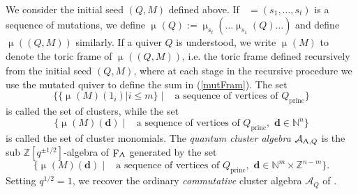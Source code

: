 \documentclass[a4paper,10pt]{amsart}
\newcommand{\dd}{\mathbf{d}}
\renewcommand{\Lambda}{\Uplambda}
\renewcommand{\mu}{\upmu}
\DeclareMathOperator{\For}{F}
\DeclareMathOperator{\princ}{princ}
\DeclareMathOperator{\Ss}{\overline{s}}
\begin{document}
We consider the initial seed $(Q,M)$ defined above.  If $\Ss=(s_1,\ldots,s_t)$ is a sequence of mutations, we define $\mu_{\Ss}(Q):=\mu_{s_t}(\ldots\mu_{s_1}(Q)\ldots )$ and define $\mu_{\Ss}((Q,M))$ similarly.  If a quiver $Q$ is understood, we write $\mu_{\Ss}(M)$ to denote the toric frame of $\mu_{\Ss}((Q,M))$, i.e. the toric frame defined recursively from the initial seed $(Q,M)$, where at each stage in the recursive procedure we use the mutated quiver to define the sum in (\ref{mutFram}).  The set 
\[
\big\{\{\mu_{\Ss}(M)(1_i)|i\leq m\}\;|\;\Ss\textrm{ a sequence of vertices of }Q_{\princ}\big\}
\]
is called the set of clusters, while the set 
\[
\{\mu_{\Ss}(M)(\dd)\;|\;\Ss\textrm{ a sequence of vertices of }Q_{\princ},\,\,\dd\in \mathbb{N}^{n}\}
\]
is called the set of cluster monomials.  The \textit{quantum cluster algebra} $\mathcal{A}_{\Lambda,Q}$ is the sub $\mathbb{Z}[q^{\pm 1/2}]$-algebra of $\For_{\Lambda}$ generated by the set
\[
\{\mu_{\Ss}(M)(\dd)\;|\;\Ss\textrm{ a sequence of vertices of }Q_{\princ},\,\, \dd\in \mathbb{N}^{m}\times\mathbb{Z}^{n-m}\}.
\]
Setting $q^{1/2}=1$, we recover the ordinary \textit{commutative} cluster algebra $\mathcal{A}_{Q}$ of \cite{FZ02}.  
\end{document}
